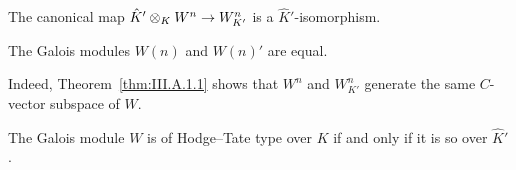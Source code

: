 \begin{theorem}[1]\label{thm:III.A.1.1}
The canonical map $\hat K'\mathbin{\otimes}_K W^n \to W^n_{K'}$ is a
$\hat K'$-isomorphism.
\end{theorem}

\begin{corollary}[1]\label{cor:III.A.1.1}
The Galois modules $W(n)$ and $W(n)'$ are equal.
\end{corollary}

Indeed, Theorem~\ref{thm:III.A.1.1} shows that $W^n$ and $W^n_{K'}$
generate the same $C$-vector subspace of $W$.

\begin{corollary}[2]\label{cor:III.A.1.2}
The Galois module $W$ is of Hodge--Tate type over $K$ if and only if it
is so over $\hat K'$.
\end{corollary}


